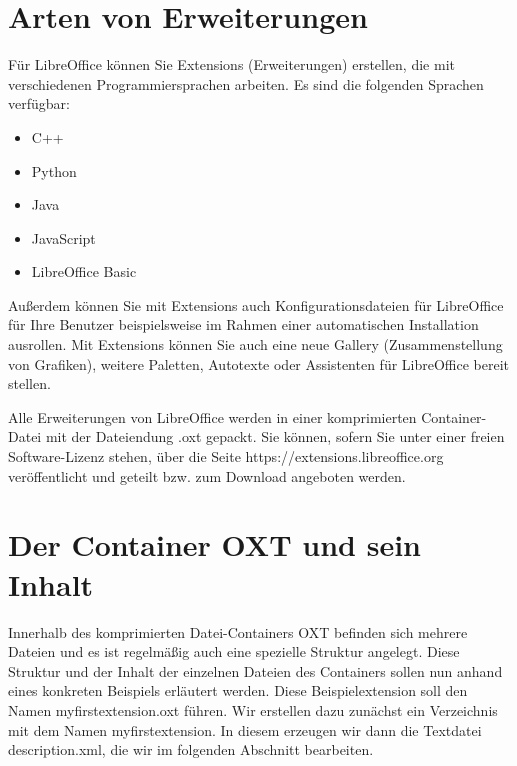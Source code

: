 \documentclass[a4paper,10pt,pagesize,titlepage]{scrbook}
\begin{document}
\chapter{Arten von Erweiterungen}
Für LibreOffice können Sie Extensions (Erweiterungen) erstellen, die mit verschiedenen Programmiersprachen arbeiten. Es sind die folgenden Sprachen verfügbar:
\begin{itemize}
	\item C++
	\item Python
	\item Java
	\item JavaScript
	\item LibreOffice Basic
\end{itemize}
Außerdem können Sie mit Extensions auch Konfigurationsdateien für LibreOffice für Ihre Benutzer beispielsweise im Rahmen einer automatischen Installation ausrollen. Mit Extensions können Sie auch eine neue Gallery (Zusammenstellung von Grafiken), weitere Paletten, Autotexte oder Assistenten für LibreOffice bereit stellen.

Alle Erweiterungen von LibreOffice werden in einer komprimierten Container-Datei mit der Dateiendung .oxt gepackt. Sie können, sofern Sie unter einer freien Software-Lizenz stehen, über die Seite https://extensions.libreoffice.org veröffentlicht und geteilt bzw. zum Download angeboten werden.

\chapter{Der Container OXT und sein Inhalt}\label{oxtcontainerinhalt}
Innerhalb des komprimierten Datei-Containers OXT befinden sich mehrere Dateien und es ist regelmäßig auch eine spezielle Struktur angelegt. Diese Struktur und der Inhalt der einzelnen Dateien des Containers sollen nun anhand eines konkreten Beispiels erläutert werden. Diese Beispielextension soll den Namen \glqq myfirstextension.oxt\grqq{} führen. Wir erstellen dazu zunächst ein Verzeichnis mit dem Namen \glqq myfirstextension\grqq. In diesem erzeugen wir dann die Textdatei description.xml, die wir im folgenden Abschnitt bearbeiten.
\end{document}
